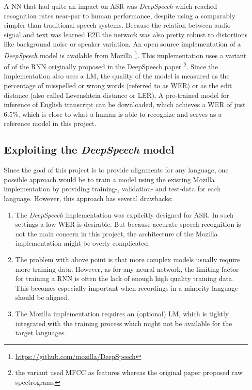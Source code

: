 A \ac{NN} that had quite an impact on \ac{ASR} was \textit{DeepSpeech} \parencite{deepspeech} which reached recognition rates near-par to human performance, despite using a comparably simpler than traditional speech systems. Because the relation between audio signal and text was learned \ac{E2E} the network was also pretty robust to distortions like background noise or speaker variation. An open source implementation of a \textit{DeepSpeech} model is available from Mozilla \footnote{\url{https://github.com/mozilla/DeepSpeech}}. This implementation uses a variant of of the \ac{RNN} originally proposed in the DeepSpeech paper \parencite{ctc_paper}\footnote{the variant used \ac{MFCC} as features whereas the original paper proposed raw spectrograms}. Since the implementation also uses a \ac{LM}, the quality of the model is measured as the percentage of misspelled or wrong words (referred to as \ac{WER}) or as the edit distance (also called Levenshtein distance or \ac{LER}). A pre-trained model for inference of English transcript can be downloaded, which achieves a \ac{WER} of just 6.5\%, which is close to what a human is able to recognize \parencite{mozillajourney} and serves as a reference model in this project.

\subsection{Exploiting the \textit{DeepSpeech} model}

Since the goal of this project is to provide alignments for any language, one possible approach would be to train a model using the existing Mozilla implementation by providing training-, validation- and test-data for each language. However, this approach has several drawbacks:

\begin{enumerate}
	\item The \textit{DeepSpeech} implementation was explicitly designed for \ac{ASR}. In such settings a low \ac{WER} is desirable. But because accurate speech recognition is not the main concern in this project, the architecture of the Mozilla implementation might be overly complicated. 
	\item The problem with above point is that more complex models usually require more training data. However, as for any neural network, the limiting factor for training a \ac{RNN} is often the lack of enough high quality training data. This becomes especially important when recordings in a minority language should be aligned. 
	\item The Mozilla implementation requires an (optional) \ac{LM}, which is tightly integrated with the training process which might not be available for the target languages.
\end{enumerate}


